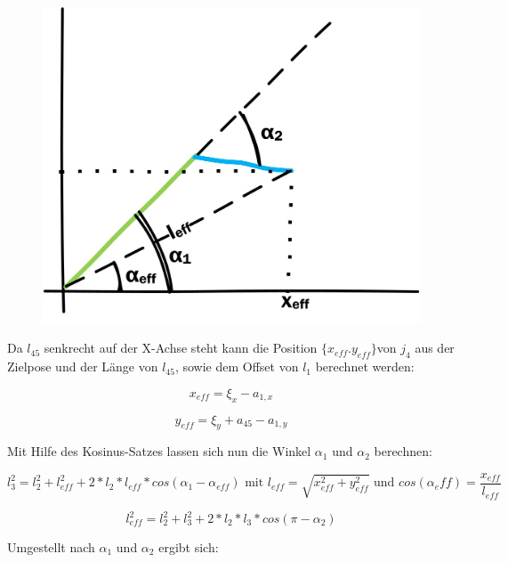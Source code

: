 \begin{figure}[h]
{		\includegraphics[scale=0.7]{fig/ikeasy3}}
	\hfill
	\label{fig:easyik}
\end{figure}


Da $l_{45}$ senkrecht auf der X-Achse steht kann die Position $\{x_{eff}. y_{eff}\}$von $j_4$ aus der Zielpose und der Länge von $l_45$, sowie dem Offset von $l_ {1}$ berechnet werden:

\begin{equation}
x_{eff} = \xi_{x} - a_{1,x}
\label{eq:9}
\end{equation}

\begin{equation}
y_{eff} = \xi_{y} + a_{45} - a_{1,y}
\label{eq:10}
\end{equation}

Mit Hilfe des Kosinus-Satzes lassen sich nun die Winkel $\alpha_1$ und $\alpha_2$ berechnen:

\begin{equation}
l_3^2 = l_2^2 + l_{eff}^2 + 2 * l_2 * l_{eff} * cos(\alpha_1 - \alpha_{eff}) \text{ mit } l_{eff} = \sqrt{x_{eff}^2 + y_{eff}^2} \text{ und } cos(\alpha_eff) = \dfrac{x_{eff}}{l_{eff}}
\label{eq:11}
\end{equation}


\begin{equation}
l_{eff}^2 = l_2^2 + l_3^2 + 2 * l_2 * l_3 * cos(\pi - \alpha_2)
\label{eq:12}
\end{equation}

Umgestellt nach $\alpha_1$ und $\alpha_2$ ergibt sich:

